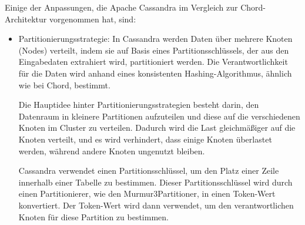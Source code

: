 \documentclass[../vs-script-first-v01.tex]{subfiles}
\begin{document}
Einige der Anpassungen, die Apache Cassandra im Vergleich zur Chord-Architektur vorgenommen hat, sind:
\begin{itemize} 
\item Partitionierungsstrategie: In Cassandra werden Daten über mehrere Knoten (Nodes) verteilt, indem sie auf Basis eines Partitionsschlüssels, der aus den Eingabedaten extrahiert wird, partitioniert werden. Die Verantwortlichkeit für die Daten wird anhand eines konsistenten Hashing-Algorithmus, ähnlich wie bei Chord, bestimmt.

Die Hauptidee hinter Partitionierungsstrategien besteht darin, den Datenraum in kleinere Partitionen aufzuteilen und diese auf die verschiedenen Knoten im Cluster zu verteilen. Dadurch wird die Last gleichmäßiger auf die Knoten verteilt, und es wird verhindert, dass einige Knoten überlastet werden, während andere Knoten ungenutzt bleiben.

Cassandra verwendet einen Partitionsschlüssel, um den Platz einer Zeile innerhalb einer Tabelle zu bestimmen. Dieser Partitionsschlüssel wird durch einen Partitionierer, wie den Murmur3Partitioner, in einen Token-Wert konvertiert. Der Token-Wert wird dann verwendet, um den verantwortlichen Knoten für diese Partition zu bestimmen.


\end{itemize}
\end{document}
